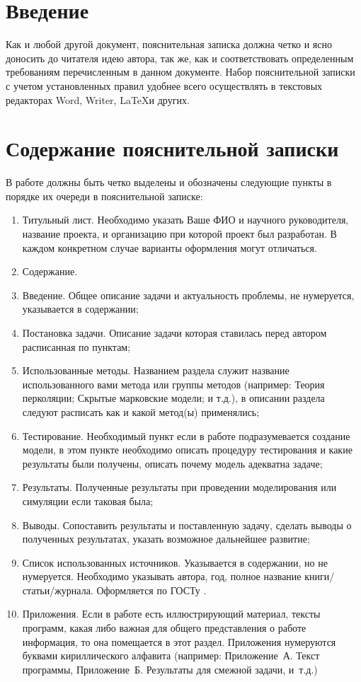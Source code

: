   
\section{Введение}
Как и любой другой документ, пояснительная записка должна четко и ясно доносить до читателя идею автора, так же, как и соответствовать определенным требованиям перечисленным в данном документе. Набор пояснительной записки с учетом установленных правил удобнее всего осуществлять в текстовых редакторах Word, Writer, \LaTeX и других.

  
\section{Содержание пояснительной записки}
В работе должны быть четко выделены и обозначены следующие пункты в порядке их очереди в пояснительной записке:
\begin{enumerate}
    \item Титульный лист. Необходимо указать Ваше ФИО и научного руководителя, название проекта, и организацию при которой проект был разработан. В каждом конкретном случае варианты оформления могут отличаться.
    \item Содержание. 
    \item Введение. Общее описание задачи и актуальность проблемы, не нумеруется, указывается в содержании;
    \item Постановка задачи. Описание задачи которая ставилась перед автором расписанная по пунктам;
    \item Использованные методы. Названием раздела служит название использованного вами метода или группы методов (например: Теория перколяции; Скрытые марковские модели; и т.д.), в описании раздела следуют расписать как и какой метод(ы) применялись;
    \item Тестирование. Необходимый пункт если в работе подразумевается создание модели, в этом пункте необходимо описать процедуру тестирования и какие результаты были получены, описать почему модель адекватна задаче;
    \item Результаты. Полученные результаты при проведении моделирования или симуляции если таковая была; 
    \item Выводы. Сопоставить результаты и поставленную задачу, сделать выводы о полученных результатах, указать возможное дальнейшее развитие;
    \item Список использованных источников. Указывается в содержании, но не нумеруется. Необходимо указывать автора, год, полное название книги/статьи/журнала. Оформляется по ГОСТу \cite{BibStandart2007}. 
    \item Приложения. Если в работе есть иллюстрирующий материал, тексты программ, 
    какая либо важная     для общего представления о работе информация, то она помещается в этот раздел.     Приложения нумеруются буквами кириллического алфавита (например: Приложение~А. Текст 
    программы,     Приложение~Б. Результаты для смежной задачи, и~т.д.)
\end{enumerate}

